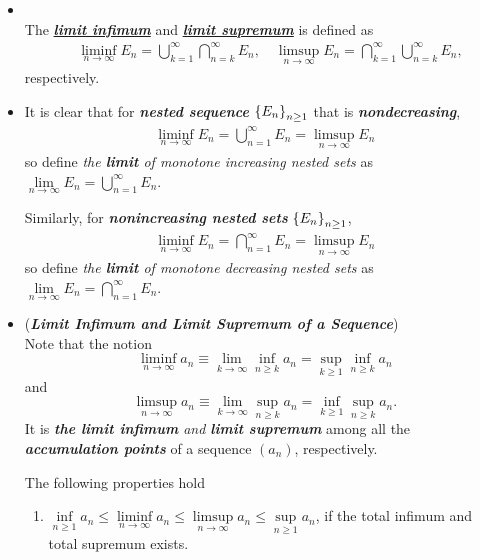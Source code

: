 \documentclass[11pt]{article}
\begin{document}
\begin{itemize}
\item \begin{definition} \citep{resnick2013probability} \\
The \underline{\emph{\textbf{limit infimum}}} and \underline{\emph{\textbf{limit supremum}}} is defined as  
\begin{align}
&\liminf\limits_{n\rightarrow \infty}E_{n} = \bigcup_{k=1}^{\infty}\bigcap_{n= k}^{\infty}E_{n}, \quad \limsup\limits_{n\rightarrow \infty}E_{n} = \bigcap_{k=1}^{\infty}\bigcup_{n= k}^{\infty}E_{n}, \label{eqn: liminf_limsup}
\end{align}
respectively.
\end{definition}

\item  \begin{remark}
It is clear that for \emph{\textbf{nested sequence}} $\left\{E_{n}\right\}_{n\ge 1}$ that is \emph{\textbf{nondecreasing}}, 
\begin{align*}
\liminf\limits_{n\rightarrow \infty}E_{n} = \bigcup_{n=1}^{\infty}E_{n} = \limsup\limits_{n\rightarrow \infty}E_{n}
\end{align*}
so define \emph{the \textbf{limit} of monotone increasing nested sets} as $\lim\limits_{n\rightarrow \infty}E_{n} = \bigcup_{n=1}^{\infty}E_{n} $.

Similarly, for \emph{\textbf{nonincreasing nested sets}} $\left\{E_{n}\right\}_{n\ge 1}$, 
\begin{align*}
\liminf\limits_{n\rightarrow \infty}E_{n} = \bigcap_{n=1}^{\infty}E_{n} = \limsup\limits_{n\rightarrow \infty}E_{n}
\end{align*}
so define \emph{the \textbf{limit} of monotone decreasing nested sets} as $\lim\limits_{n\rightarrow \infty}E_{n} = \bigcap_{n=1}^{\infty}E_{n} $.
\end{remark}

\item  \begin{remark} (\emph{\textbf{Limit Infimum and Limit Supremum of a Sequence}})\\
Note that the notion $$\liminf_{n\rightarrow \infty}a_{n} \equiv \lim_{k\rightarrow \infty}\inf_{n\ge k}a_{n} = \sup_{k\ge 1}\inf_{n\ge k}a_{n} $$ and $$\limsup_{n\rightarrow \infty}a_{n} \equiv \lim_{k\rightarrow \infty}\sup_{n\ge k}a_{n} = \inf_{k\ge 1}\sup_{n\ge k}a_{n}.$$ It is \emph{\textbf{the limit infimum} and \textbf{limit supremum}} among all the \emph{\textbf{accumulation points}} of a sequence $(a_{n})$, respectively. 

\begin{proposition}
The following properties hold
\begin{enumerate}
\item $\inf\limits_{n \ge 1}a_{n} \le \liminf\limits_{n\rightarrow \infty}a_{n}  \le \limsup\limits_{n\rightarrow \infty}a_{n} \le \sup\limits_{n \ge 1}a_{n}$, if the total infimum and total supremum exists.


\end{enumerate}
\end{proposition}
\end{remark}
\end{itemize}
\end{document}
